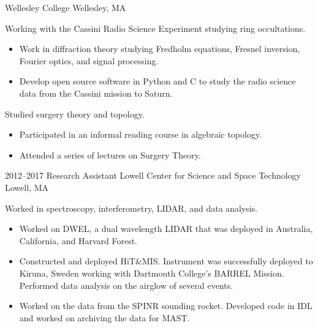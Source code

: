 \documentclass[a4paper,sans]{moderncv}
\begin{document}
            {Wellesley College}
            {Wellesley, MA}
            {}
            {%
                Working with the Cassini Radio Science
                Experiment studying ring occultations.
                \begin{itemize}
                    \item
                        Work in diffraction theory studying Fredholm
                        equations, Fresnel inversion, Fourier optics,
                        and signal processing.
                     \item
                        Develop open source software in Python and C to
                        study the radio science data from the
                        Cassini mission to Saturn.
                 \end{itemize}
                 Studied surgery theory and topology.
                 \begin{itemize}
                     \item
                        Participated in an informal reading
                        course in algebraic topology.
                     \item
                        Attended a series of lectures on Surgery Theory.
                 \end{itemize}%
             }
        \cventry%
            {2012--2017}
            {Research Assistant}
            {Lowell Center for Science and Space Technology}
            {Lowell, MA}
            {}
            {%
                Worked in spectroscopy, interferometry,
                LIDAR, and data analysis.
                \begin{itemize}
                    \item
                        Worked on DWEL, a dual wavelength LIDAR that was
                        deployed in Australia, California, and Harvard Forest.
                    \item
                        Constructed and deployed HiT\&MIS.
                        Instrument was successfully deployed to Kiruna,
                        Sweden working with Dartmouth College's BARREL
                        Mission. Performed data analysis on the airglow of
                        several events.
                    \item
                        Worked on the data from the SPINR sounding rocket.
                        Developed code in IDL and worked on archiving the
                        data for MAST.
                \end{itemize}%
             }
\end{document}
